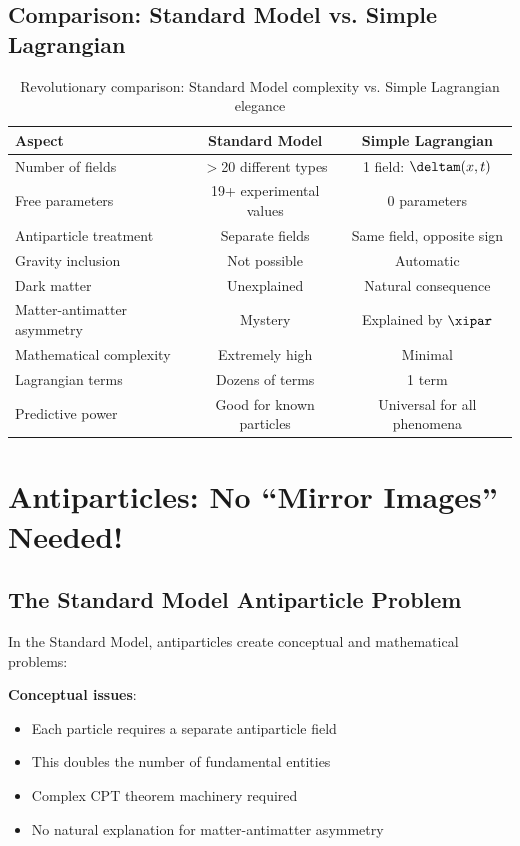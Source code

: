 	\subsection{Comparison: Standard Model vs. Simple Lagrangian}
	
	\begin{table}[htbp]
		\centering
		\begin{tabular}{lcc}
			\toprule
			\textbf{Aspect} & \textbf{Standard Model} & \textbf{Simple Lagrangian} \\
			\midrule
			Number of fields & $>$20 different types & 1 field: $\deltam(x,t)$ \\
			Free parameters & 19+ experimental values & 0 parameters \\
			Antiparticle treatment & Separate fields & Same field, opposite sign \\
			Gravity inclusion & Not possible & Automatic \\
			Dark matter & Unexplained & Natural consequence \\
			Matter-antimatter asymmetry & Mystery & Explained by $\xipar$ \\
			Mathematical complexity & Extremely high & Minimal \\
			Lagrangian terms & Dozens of terms & 1 term \\
			Predictive power & Good for known particles & Universal for all phenomena \\
			\bottomrule
		\end{tabular}
		\caption{Revolutionary comparison: Standard Model complexity vs. Simple Lagrangian elegance}
		\label{tab:sm_simple_comparison}
	\end{table}
	
	\section{Antiparticles: No ``Mirror Images'' Needed!}
	
	\subsection{The Standard Model Antiparticle Problem}
	
	In the Standard Model, antiparticles create conceptual and mathematical problems:
	
	\textbf{Conceptual issues}:
	\begin{itemize}
		\item Each particle requires a separate antiparticle field
		\item This doubles the number of fundamental entities
		\item Complex CPT theorem machinery required
		\item No natural explanation for matter-antimatter asymmetry
	\end{itemize}
	
